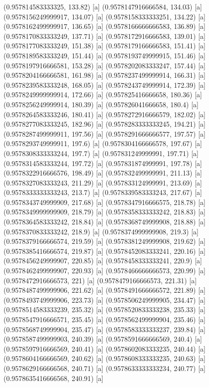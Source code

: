 {{{(0.957814583333325, 133.82) [a] 
(0.9578147916666584, 134.03) [a] 
(0.9578156249999917, 134.07) [a] 
(0.9578158333333251, 134.22) [a] 
(0.9578162499999917, 136.65) [a] 
(0.9578166666666583, 136.89) [a] 
(0.9578170833333249, 137.71) [a] 
(0.9578172916666583, 139.01) [a] 
(0.9578177083333249, 151.38) [a] 
(0.9578179166666583, 151.41) [a] 
(0.9578189583333249, 151.44) [a] 
(0.9578193749999915, 151.46) [a] 
(0.9578197916666581, 153.28) [a] 
(0.9578202083333247, 157.44) [a] 
(0.9578204166666581, 161.98) [a] 
(0.9578237499999914, 166.31) [a] 
(0.9578239583333248, 168.05) [a] 
(0.9578243749999914, 172.39) [a] 
(0.9578249999999914, 172.66) [a] 
(0.957825416666658, 180.36) [a] 
(0.9578256249999914, 180.39) [a] 
(0.957826041666658, 180.4) [a] 
(0.9578264583333246, 180.41) [a] 
(0.9578272916666579, 182.02) [a] 
(0.9578277083333245, 182.96) [a] 
(0.9578283333333245, 194.21) [a] 
(0.9578287499999911, 197.56) [a] 
(0.9578291666666577, 197.57) [a] 
(0.9578293749999911, 197.6) [a] 
(0.9578304166666578, 197.67) [a] 
(0.9578308333333244, 197.7) [a] 
(0.957831249999991, 197.71) [a] 
(0.9578314583333244, 197.72) [a] 
(0.957831874999991, 197.78) [a] 
(0.9578322916666576, 198.49) [a] 
(0.957832499999991, 211.13) [a] 
(0.9578327083333243, 211.29) [a] 
(0.957833124999991, 213.69) [a] 
(0.9578333333333243, 213.7) [a] 
(0.9578339583333243, 217.67) [a] 
(0.9578343749999909, 217.68) [a] 
(0.9578347916666575, 218.78) [a] 
(0.9578349999999909, 218.79) [a] 
(0.9578358333333242, 218.83) [a] 
(0.9578364583333242, 218.84) [a] 
(0.9578368749999908, 218.88) [a] 
(0.9578370833333242, 218.9) [a] 
(0.9578374999999908, 219.3) [a] 
(0.9578379166666574, 219.59) [a] 
(0.9578381249999908, 219.62) [a] 
(0.9578385416666574, 219.87) [a] 
(0.9578452083333241, 220.16) [a] 
(0.9578456249999907, 220.85) [a] 
(0.9578458333333241, 220.9) [a] 
(0.9578462499999907, 220.93) [a] 
(0.9578466666666573, 220.99) [a] 
(0.9578472916666573, 221) [a] 
(0.9578479166666573, 221.31) [a] 
(0.9578487499999906, 221.62) [a] 
(0.9578491666666572, 221.89) [a] 
(0.9578493749999906, 223.73) [a] 
(0.9578506249999905, 234.47) [a] 
(0.9578514583333239, 235.32) [a] 
(0.9578520833333238, 235.33) [a] 
(0.9578547916666571, 235.45) [a] 
(0.9578562499999904, 235.46) [a] 
(0.9578568749999904, 235.47) [a] 
(0.9578583333333237, 239.84) [a] 
(0.9578587499999903, 240.39) [a] 
(0.9578591666666569, 240.4) [a] 
(0.9578597916666569, 240.41) [a] 
(0.9578602083333235, 240.44) [a] 
(0.9578604166666569, 240.62) [a] 
(0.9578608333333235, 240.63) [a] 
(0.9578629166666568, 240.71) [a] 
(0.9578633333333234, 240.77) [a] 
(0.9578635416666568, 240.91) [a] 
}}}
